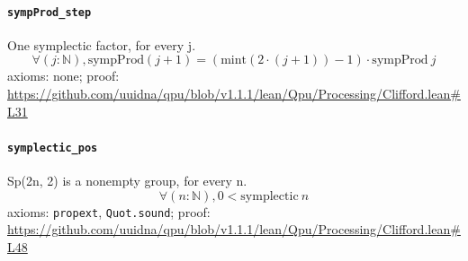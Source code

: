\documentclass[11pt]{article}
\begin{document}
\paragraph{\texttt{sympProd\_step}}
One symplectic factor, for every j.
\[ \forall (j : \mathbb{N}), \mathrm{sympProd} (j + 1) = (\mathrm{mint} (2 \cdot (j + 1)) - 1) \cdot \mathrm{sympProd}\ j \]
\noindent axioms: none; proof: \url{https://github.com/uuidna/qpu/blob/v1.1.1/lean/Qpu/Processing/Clifford.lean\#L31}

\paragraph{\texttt{symplectic\_pos}}
Sp(2n, 2) is a nonempty group, for every n.
\[ \forall (n : \mathbb{N}), 0 < \mathrm{symplectic}\ n \]
\noindent axioms: \texttt{propext}, \texttt{Quot.sound}; proof: \url{https://github.com/uuidna/qpu/blob/v1.1.1/lean/Qpu/Processing/Clifford.lean\#L48}
\end{document}
